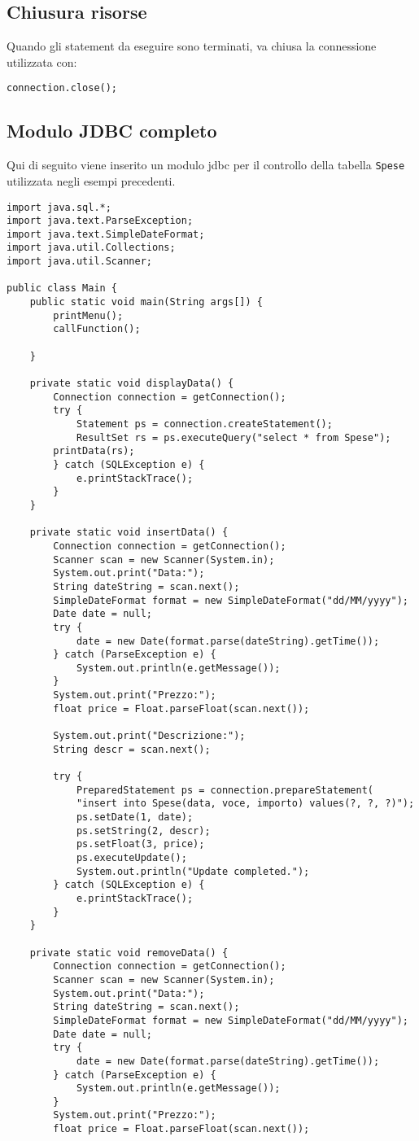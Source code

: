 \documentclass[a4paper, 10pt, titlepage]{article}
\begin{document}
\subsection{Chiusura risorse}
Quando gli statement da eseguire sono terminati, va chiusa la connessione utilizzata con:
\begin{lstlisting}
connection.close();
\end{lstlisting}

\subsection{Modulo JDBC completo}
Qui di seguito viene inserito un modulo jdbc per il controllo della tabella \lstinline|Spese| utilizzata negli esempi precedenti.

\begin{lstlisting}[tabsize=2]
import java.sql.*;
import java.text.ParseException;
import java.text.SimpleDateFormat;
import java.util.Collections;
import java.util.Scanner;

public class Main {
	public static void main(String args[]) {
		printMenu();
		callFunction();

	}

	private static void displayData() {
		Connection connection = getConnection();
		try {
			Statement ps = connection.createStatement();
			ResultSet rs = ps.executeQuery("select * from Spese");
		printData(rs);
		} catch (SQLException e) {
			e.printStackTrace();
		}
	}
	
	private static void insertData() {
		Connection connection = getConnection();
		Scanner scan = new Scanner(System.in);
		System.out.print("Data:");
		String dateString = scan.next();
		SimpleDateFormat format = new SimpleDateFormat("dd/MM/yyyy");
		Date date = null;
		try {
			date = new Date(format.parse(dateString).getTime());
		} catch (ParseException e) {
			System.out.println(e.getMessage());
		}
		System.out.print("Prezzo:");
		float price = Float.parseFloat(scan.next());
		
		System.out.print("Descrizione:");
		String descr = scan.next();
		
		try {
			PreparedStatement ps = connection.prepareStatement(
			"insert into Spese(data, voce, importo) values(?, ?, ?)");
			ps.setDate(1, date);
			ps.setString(2, descr);
			ps.setFloat(3, price);
			ps.executeUpdate();
			System.out.println("Update completed.");
		} catch (SQLException e) {
			e.printStackTrace();
		}	
	}
	
	private static void removeData() {
		Connection connection = getConnection();
		Scanner scan = new Scanner(System.in);
		System.out.print("Data:");
		String dateString = scan.next();
		SimpleDateFormat format = new SimpleDateFormat("dd/MM/yyyy");
		Date date = null;
		try {
			date = new Date(format.parse(dateString).getTime());
		} catch (ParseException e) {
			System.out.println(e.getMessage());
		}
		System.out.print("Prezzo:");
		float price = Float.parseFloat(scan.next());
		

\end{lstlisting}
\end{document}

